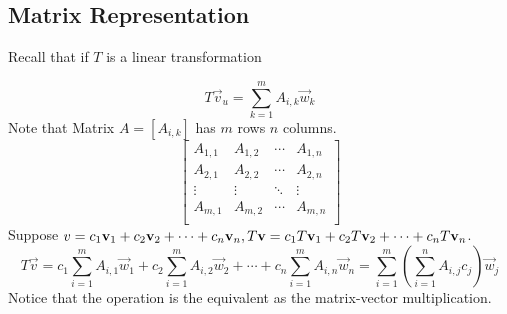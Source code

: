 \subsection{Matrix Representation} 
Recall that if $T$ is a linear transformation
\begin{center}
\end{center}
\[ T\vec v_u = \sum_{k = 1}^{m} A_{i,k} \vec w_k \]
Note that Matrix $A = \left[ A_{i,k} \right]$ has $m$ rows $n$ columns.
\[\left[ \begin{array}{cccc} A_{1,1} & A_{1,2} & \cdots & A_{1,n} \\
        A_{2,1} & A_{2,2} & \cdots & A_{2,n} \\
        \vdots & \vdots & \ddots & \vdots  \\
        A_{m,1} & A_{m,2} & \cdots & A_{m,n} \\
        \end{array} \right]\]
Suppose $v = {c}_1{\mathbf v}_1 + {c}_2{\mathbf v}_2 + \cdots + {c}_{n}{\mathbf v}_{n}, T\mathbf v = {c}_1{T\mathbf v}_1 + {c}_2{T\mathbf v}_2 + \cdots + {c}_{n}{T\mathbf v}_{n}$.
\[T\vec v =  c_1 \sum_{i=1}^m A_{i,1} \vec w_1  +  c_2 \sum_{i=1}^m A_{i,2} \vec w_2 + \cdots + c_n \sum_{i=1}^m A_{i,n} \vec w_n = \sum_{i = 1}^m \left( \sum_{i = 1}^n A_{i,j} c_j \right) \vec w_j \]
Notice that the operation is the equivalent as the matrix-vector multiplication.

